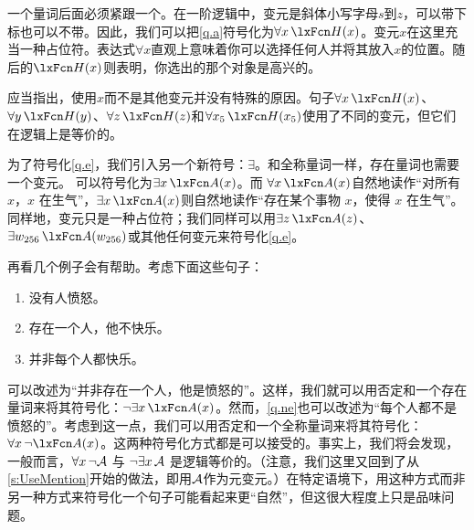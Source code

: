 一个量词后面必须紧跟一个。在一阶逻辑中，变元是斜体小写字母$s$到$z$，可以带下标也可以不带。因此，我们可以把\cref*{q.a}符号化为$\forall x\, \atom{H}{x}$。变元$x$在这里充当一种占位符。表达式$\forall x$直观上意味着你可以选择任何人并将其放入$x$的位置。随后的$\atom{H}{x}$则表明，你选出的那个对象是高兴的。


应当指出，使用$x$而不是其他变元并没有特殊的原因。句子$\forall x\,
\atom{H}{x}$、$\forall y\, \atom{H}{y}$、$\forall z\,
\atom{H}{z}$和$\forall x_5\, \atom{H}{x_5}$使用了不同的变元，但它们在逻辑上是等价的。

为了符号化\cref{q.e}，我们引入另一个新符号：$\exists$。和全称量词一样，存在量词也需要一个变元。
可以符号化为$\exists x\,\atom{A}{x}$。而
$\forall x\,\atom{A}{x}$自然地读作“对所有 $x$，$x$ 在生气”，$\exists x\,\atom{A}{x}$则自然地读作“存在某个事物 $x$，使得 $x$ 在生气”。同样地，变元只是一种占位符；我们同样可以用$\exists z\, \atom{A}{z}$、$\exists w_{256}\,
\atom{A}{w_{256}}$或其他任何变元来符号化\cref*{q.e}。


再看几个例子会有帮助。考虑下面这些句子：

\begin{enumerate}
		\item\label{q.ne} 没有人愤怒。
		\item\label{q.en} 存在一个人，他不快乐。
		\item\label{q.na} 并非每个人都快乐。
	\end{enumerate}

可以改述为“并非存在一个人，他是愤怒的”。这样，我们就可以用否定和一个存在量词来将其符号化：$\enot \exists x\,\atom{A}{x}$。然而，\cref*{q.ne}也可以改述为“每个人都不是愤怒的”。考虑到这一点，我们可以用否定和一个全称量词来将其符号化：$\forall x\, \enot \atom{A}{x}$。这两种符号化方式都是可以接受的。事实上，我们将会发现，一般而言，$\forall x\, \neg\mathcal{A}$ 与 $\neg\exists x\,\mathcal{A}$ 是逻辑等价的。（注意，我们这里又回到了从\cref{s:UseMention}开始的做法，即用$\mathcal{A}$作为元变元。）在特定语境下，用这种方式而非另一种方式来符号化一个句子可能看起来更“自然”，但这很大程度上只是品味问题。

